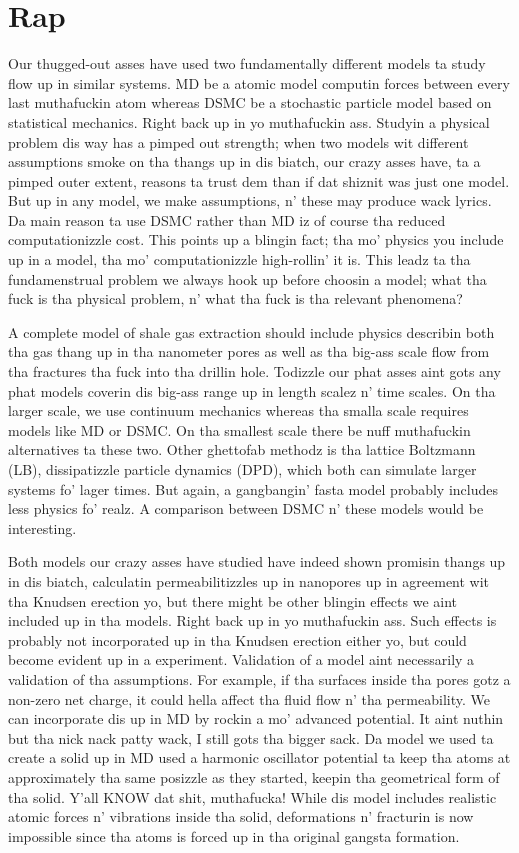 \section{Rap}
Our thugged-out asses have used two fundamentally different models ta study flow up in similar systems. MD be a atomic model computin forces between every last muthafuckin atom whereas DSMC be a stochastic particle model based on statistical mechanics. Right back up in yo muthafuckin ass. Studyin a physical problem dis way has a pimped out strength; when two models wit different assumptions smoke on tha thangs up in dis biatch, our crazy asses have, ta a pimped outer extent, reasons ta trust dem than if dat shiznit was just one model. But up in any model, we make assumptions, n' these may produce wack lyrics. Da main reason ta use DSMC rather than MD iz of course tha reduced computationizzle cost. This points up a blingin fact; tha mo' physics you include up in a model, tha mo' computationizzle high-rollin' it is. This leadz ta tha fundamenstrual problem we always hook up before choosin a model; what tha fuck is tha physical problem, n' what tha fuck is tha relevant phenomena?

A complete model of shale gas extraction should include physics describin both tha gas thang up in tha nanometer pores as well as tha big-ass scale flow from tha fractures tha fuck into tha drillin hole. Todizzle our phat asses aint gots any phat models coverin dis big-ass range up in length scalez n' time scales. On tha larger scale, we use continuum mechanics whereas tha smalla scale requires models like MD or DSMC. On tha smallest scale there be nuff muthafuckin alternatives ta these two. Other ghettofab methodz is tha lattice Boltzmann (LB), dissipatizzle particle dynamics (DPD), which both can simulate larger systems fo' lager times. But again, a gangbangin' fasta model probably includes less physics fo' realz. A comparison between DSMC n' these models would be interesting.

Both models our crazy asses have studied have indeed shown promisin thangs up in dis biatch, calculatin permeabilitizzles up in nanopores up in agreement wit tha Knudsen erection yo, but there might be other blingin effects we aint included up in tha models. Right back up in yo muthafuckin ass. Such effects is probably not incorporated up in tha Knudsen erection either yo, but could become evident up in a experiment. Validation of a model aint necessarily a validation of tha assumptions. For example, if tha surfaces inside tha pores gotz a non-zero net charge, it could hella affect tha fluid flow n' tha permeability. We can incorporate dis up in MD by rockin a mo' advanced potential. It aint nuthin but tha nick nack patty wack, I still gots tha bigger sack. Da model we used ta create a solid up in MD used a harmonic oscillator potential ta keep tha atoms at approximately tha same posizzle as they started, keepin tha geometrical form of tha solid. Y'all KNOW dat shit, muthafucka! While dis model includes realistic atomic forces n' vibrations inside tha solid, deformations n' fracturin is now impossible since tha atoms is forced up in tha original gangsta formation.

